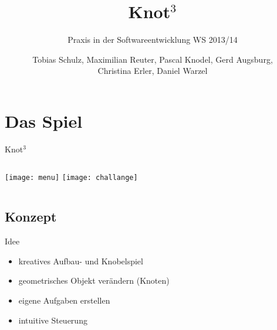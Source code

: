 \documentclass[18pt]{beamer}
\title[]{\huge{Knot$^3$} }
\subtitle{Praxis in der Softwareentwicklung WS 2013/14}
\author{Tobias Schulz, Maximilian Reuter, Pascal Knodel, Gerd Augsburg,\\ Christina Erler, Daniel Warzel}
\institute{Institut für Betriebs- und Dialogsysteme, Lehrstuhl für Computergrafik}
\begin{document}

\begin{frame}
\titlepage
\end{frame}


\section{Das Spiel}
\begin{frame}{Knot$^3$}

\begin{columns}[c]
	\texttt{[image: menu]}
 	\texttt{[image: challange]}
\end{columns}

\end{frame}


\subsection{Konzept}
\begin{frame}{Idee}
\begin{itemize}
\item kreatives Aufbau- und Knobelspiel
\item geometrisches Objekt verändern (Knoten)
\item eigene Aufgaben erstellen
\item intuitive Steuerung
\end{itemize}
\end{frame}


\end{document}

